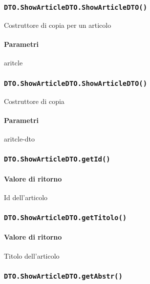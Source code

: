 \subsubsection{\texttt{DTO.ShowArticleDTO.ShowArticleDTO()}}
Costruttore di copia per un articolo
\paragraph{Parametri}
\begin{description}
\item aritcle
\end{description}
\subsubsection{\texttt{DTO.ShowArticleDTO.ShowArticleDTO()}}
Costruttore di copia
\paragraph{Parametri}
\begin{description}
\item aritcle-dto
\end{description}
\subsubsection{\texttt{DTO.ShowArticleDTO.getId()}}
\paragraph{Valore di ritorno}
\begin{description}
\item Id dell'articolo 
\end{description}
\subsubsection{\texttt{DTO.ShowArticleDTO.getTitolo()}}
\paragraph{Valore di ritorno}
\begin{description}
\item Titolo dell'articolo
\end{description}
\subsubsection{\texttt{DTO.ShowArticleDTO.getAbstr()}}
